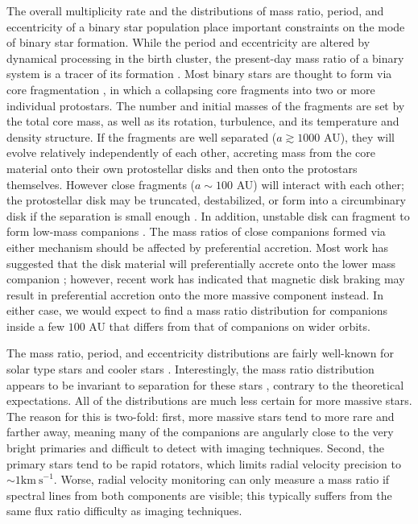 \documentclass{emulateapj}
\begin{document}
The overall multiplicity rate and the distributions of mass ratio, period, and eccentricity of a binary star population place important constraints on the mode of binary star formation. While the period and eccentricity are altered by dynamical processing in the birth cluster, the present-day mass ratio of a binary system is a tracer of its formation \citep{Parker2013}. Most binary stars are thought to form via core fragmentation \citep{Boss1979, Boss1986, Bate1995}, in which a collapsing core fragments into two or more individual protostars. The number and initial masses of the fragments are set by the total core mass, as well as its rotation, turbulence, and its temperature and density structure. If the fragments are well separated ($a \gtrsim 1000$ AU), they will evolve relatively independently of each other, accreting mass from the core material onto their own protostellar disks and then onto the protostars themselves. However close fragments ($a \sim 100$ AU) will interact with each other; the protostellar disk may be truncated, destabilized, or form into a circumbinary disk if the separation is small enough \citep{Bate1997}. In addition, unstable disk can fragment to form low-mass companions \citep{Kratter2006, Stamatellos2011}. The mass ratios of close companions formed via either mechanism should be affected by preferential accretion. Most work has suggested that the disk material will preferentially accrete onto the lower mass companion \citep{Bate1997, BBB2002}; however, recent work has indicated that magnetic disk braking may result in preferential accretion onto the more massive component \citep{Zhao2013} instead. In either case, we would expect to find a mass ratio distribution for companions inside a few $100$ AU that differs from that of companions on wider orbits.

The mass ratio, period, and eccentricity distributions are fairly well-known for solar type stars \citep{Duquennoy1991, Raghavan2010} and cooler stars \citep{Fischer1992, Delfosse2004}. Interestingly, the mass ratio distribution appears to be invariant to separation for these stars \citep{Meyer2013}, contrary to the theoretical expectations. All of the distributions are much less certain for more massive stars. The reason for this is two-fold: first, more massive stars tend to more rare and farther away, meaning many of the companions are angularly close to the very bright primaries and difficult to detect with imaging techniques. Second, the primary stars tend to be rapid rotators, which limits radial velocity precision to $\sim 1 \mathrm{km\ s}^{-1}$. Worse, radial velocity monitoring can only measure a mass ratio if spectral lines from both components are visible; this typically suffers from the same flux ratio difficulty as imaging techniques. 
\end{document}
